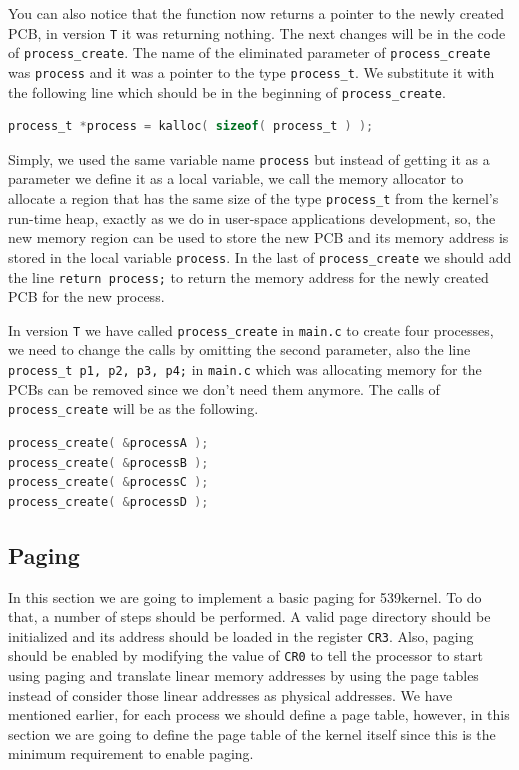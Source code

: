 You can also notice that the function now returns a pointer to the newly
created PCB, in version \lstinline!T! it was returning nothing. The next
changes will be in the code of \lstinline!process_create!. The name of
the eliminated parameter of \lstinline!process_create! was
\lstinline!process! and it was a pointer to the type
\lstinline!process_t!. We substitute it with the following line which
should be in the beginning of \lstinline!process_create!.

\begin{lstlisting}[language=C]
process_t *process = kalloc( sizeof( process_t ) );
\end{lstlisting}

Simply, we used the same variable name \lstinline!process! but instead
of getting it as a parameter we define it as a local variable, we call
the memory allocator to allocate a region that has the same size of the
type \lstinline!process_t! from the kernel's run-time heap, exactly as
we do in user-space applications development, so, the new memory region
can be used to store the new PCB and its memory address is stored in the
local variable \lstinline!process!. In the last of
\lstinline!process_create! we should add the line
\lstinline!return process;! to return the memory address for the newly
created PCB for the new process.

In version \lstinline!T! we have called \lstinline!process_create! in
\lstinline!main.c! to create four processes, we need to change the calls
by omitting the second parameter, also the line
\lstinline!process_t p1, p2, p3, p4;! in \lstinline!main.c! which was
allocating memory for the PCBs can be removed since we don't need them
anymore. The calls of \lstinline!process_create! will be as the
following.

\begin{lstlisting}[language=C]
process_create( &processA );
process_create( &processB );
process_create( &processC );
process_create( &processD );
\end{lstlisting}

\subsection{Paging}\label{paging}

In this section we are going to implement a basic paging for 539kernel.
To do that, a number of steps should be performed. A valid page
directory should be initialized and its address should be loaded in the
register \lstinline!CR3!. Also, paging should be enabled by modifying
the value of \lstinline!CR0! to tell the processor to start using paging
and translate linear memory addresses by using the page tables instead
of consider those linear addresses as physical addresses. We have
mentioned earlier, for each process we should define a page table,
however, in this section we are going to define the page table of the
kernel itself since this is the minimum requirement to enable paging.

